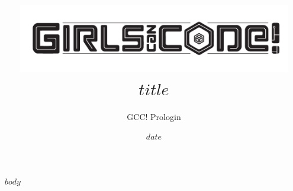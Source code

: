 \documentclass[a4paper,french,11pt]{article}
\title{
    \protect\centering\protect\includegraphics[height=3cm]{../logo_gcc_long.pdf}\\
    {$title$}
}
\author{GCC! \textendash{} Prologin}
\date{$date$}
\begin{document}
\maketitle

$body$
\end{document}
